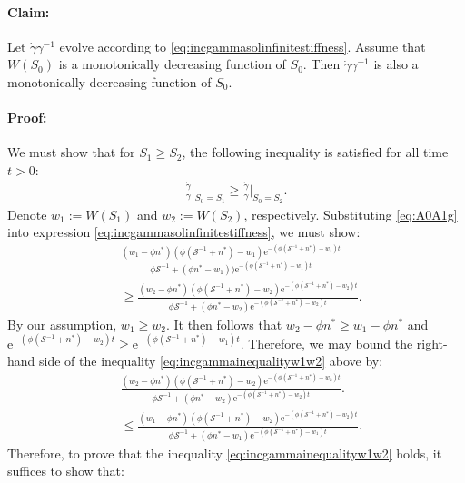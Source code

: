 \paragraph{Claim:} Let $\dot{\gamma}\gamma^{-1}$ evolve according to \eqref{eq:incgammasolinfinitestiffness}. Assume that $W(S_0)$ is a monotonically decreasing function of $S_0$. Then $\dot{\gamma}\gamma^{-1}$ is also a monotonically decreasing function of $S_0$.
\paragraph{Proof:} We must show that for $S_1 \ge S_2$, the following inequality is satisfied for all time $t > 0$:
\begin{align}
\frac{\dot{\gamma}}{\gamma}\Big |_{S_0 = S_1} \ge \frac{\dot{\gamma}}{\gamma}\Big |_{S_0 = S_2}.\label{eq:incgammainequality}
\end{align}
Denote $w_1 := W(S_1)$ and $w_2 := W(S_2)$, respectively. Substituting \eqref{eq:A0A1g} into expression \eqref{eq:incgammasolinfinitestiffness}, we must show:
\begin{align}
&\frac{(w_1 - \phi n^*)(\phi(\mathcal{S}^{-1} + n^*) - w_1)\mathrm{e}^{-(\phi(\mathcal{S}^{-1} + n^*) - w_1)t}}{\phi\mathcal{S}^{-1} + (\phi n^* - w_1))\mathrm{e}^{-(\phi(\mathcal{S}^{-1} + n^*) - w_1)t}}\nonumber\\
&\ge \frac{(w_2 - \phi n^*)(\phi(\mathcal{S}^{-1} + n^*) - w_2)\mathrm{e}^{-(\phi(\mathcal{S}^{-1} + n^*) - w_2)t}}{\phi\mathcal{S}^{-1} + (\phi n^* - w_2)\mathrm{e}^{-(\phi(\mathcal{S}^{-1} + n^*) - w_2)t}}.\label{eq:incgammainequalityw1w2}
\end{align}
By our assumption, $w_1 \ge w_2$. It then follows that $w_2 - \phi n^* \ge w_1 - \phi n^*$ and $\mathrm{e}^{-(\phi(\mathcal{S}^{-1} + n^*) - w_2)t} \ge \mathrm{e}^{-(\phi(\mathcal{S}^{-1} + n^*) - w_1)t}$. Therefore, we may bound the right-hand side of the inequality \eqref{eq:incgammainequalityw1w2} above by:
\begin{align}
&\frac{(w_2 - \phi n^*)(\phi(\mathcal{S}^{-1} + n^*) - w_2)\mathrm{e}^{-(\phi(\mathcal{S}^{-1} + n^*) - w_2)t}}{\phi\mathcal{S}^{-1} + (\phi n^* - w_2)\mathrm{e}^{-(\phi(\mathcal{S}^{-1} + n^*) - w_2)t}}.\nonumber\\
&\le  \frac{(w_1- \phi n^*)(\phi(\mathcal{S}^{-1} + n^*) - w_2)\mathrm{e}^{-(\phi(\mathcal{S}^{-1} + n^*) - w_2)t}}{\phi\mathcal{S}^{-1} + (\phi n^* - w_1)\mathrm{e}^{-(\phi(\mathcal{S}^{-1} + n^*) - w_1)t}}.
\end{align}
Therefore, to prove that the inequality \eqref{eq:incgammainequalityw1w2} holds, it suffices to show that:
